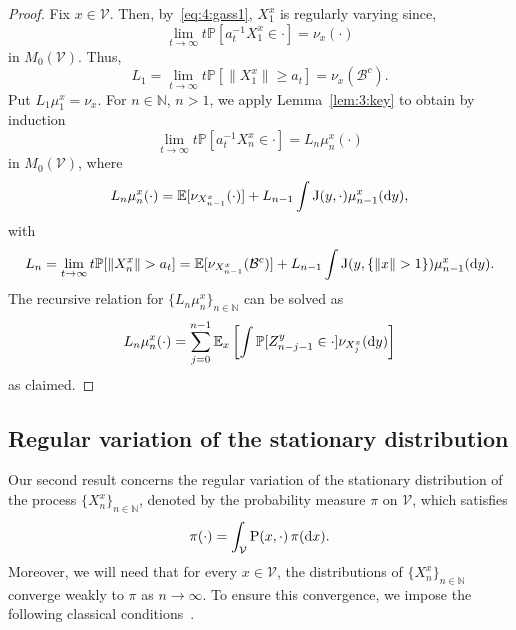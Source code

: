 \documentclass[preprint,12pt]{elsarticle}
\theoremstyle{definition}
\theoremstyle{remark}
\newcommand{\bfx}{{ x}}
\newcommand{\xbf}{{ x}}
\newcommand{\ybf}{{ y}}
\newcommand{\Xbf}{{ X}}
\newcommand{\Zbf}{{ Z}}
\newcommand{\bfy}{{ y}}
\newcommand{\1}{{\mathbf 1}}
\numberwithin{equation}{section}
\newcommand{\Ebb}{\mathbb{E}}  %
\newcommand{\Pbb}{\mathbb{P}}
\newcommand{\ud}{{\rm d}}
\newcommand{\Prm}{{\rm P}}
\newcommand{\Krm}{{\rm J}}
\newcommand{\Vcal}{\mathcal{V}}
\newcommand{\Bcal}{\mathcal{B}}
\begin{document}
  \begin{proof}
    Fix $\xbf \in \Vcal$. Then, by~\eqref{eq:4:gass1}, $\Xbf_1^\xbf$ 
    is regularly varying since, 
    \begin{equation*}  
      \lim_{t \to \infty} t \Pbb \left[ a_t^{-1} \Xbf_1^\xbf \in \cdot \right] 
      = \nu_\xbf(\cdot)  
    \end{equation*}  
    in $M_0(\Vcal)$. Thus,  
    \begin{equation*}  
      L_1 = \lim_{t \to \infty} t \Pbb \left[ \|\Xbf_1^\xbf\| \geq a_t \right] 
      = \nu_\xbf(\Bcal^c).  
    \end{equation*} 
    Put $L_1\mu_1^\xbf=\nu_\xbf$. 
    For \( n \in \mathbb{N} \), \( n > 1 \), we apply Lemma~\ref{lem:3:key} 
    to obtain by induction  
    \begin{equation*}  
      \lim_{t \to \infty} t \Pbb \left[ a_t^{-1} \Xbf_n^\xbf \in \cdot \right] 
      = L_n\mu^\xbf_n(\cdot)  
    \end{equation*}  
    in $M_0(\Vcal)$, where  
    \begin{equation*}  
      L_n \mu^\xbf_n(\cdot) =  
      \Ebb[\nu_{\Xbf^\xbf_{n-1}}(\cdot)] + L_{n-1} \int \Krm(\bfy,\cdot) 
      \mu^\xbf_{n-1} (\ud \bfy),  
    \end{equation*}  
    with  
    \begin{equation*}  
      L_n = \lim_{t \to \infty} t \Pbb[\|\Xbf_n^\xbf\| > a_t] = \\  
       \Ebb[\nu_{\Xbf^\xbf_{n-1}}(\Bcal^c)] +  
      L_{n-1} \int \Krm(\bfy, \{\|\bfx\| > 1\}) \mu^\xbf_{n-1} (\ud \bfy).  
    \end{equation*}  
    The recursive relation for \(\{L_n \mu^\xbf_n\}_{n \in \mathbb{N}}\) 
    can be solved as  
    \[
      L_n \mu^\xbf_n (\cdot)
      = \sum_{j=0}^{n-1} \Ebb_\xbf \left[ \int \Pbb[ \Zbf_{n-j-1}^\ybf \in \cdot] 
      \nu_{\Xbf^\xbf_j} (\ud \ybf) \right] 
    \]  
    as claimed.
  \end{proof}

\subsection{Regular variation of the stationary distribution}

  Our second result concerns the regular variation of the stationary distribution 
  of the process $\{\Xbf_n^\xbf\}_{n\in \mathbb{N}}$, denoted by the probability measure 
  $\pi$ on $\Vcal$, which satisfies
  \begin{equation*}
    \pi(\cdot) = \int_{\Vcal} \Prm(\xbf, \cdot)\, \pi(\ud \xbf).
  \end{equation*}
  Moreover, we will need that for every $\xbf \in \Vcal$, 
  the distributions of $\{\Xbf_n^{\xbf}\}_{n \in \mathbb{N}}$ converge weakly to $\pi$ 
  as $n \to \infty$. 
  To ensure this convergence, we impose the following classical
  conditions~\cite{harris1956existence, hairer2011yet}.
\end{document}
